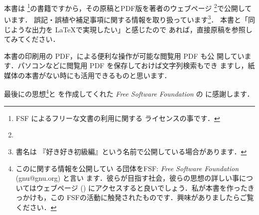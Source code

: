 本書は \fdl\footnote{FSF によるフリーな文書の利用に関する
ライセンスの事です．}の書籍ですから，その原稿とPDF版を著者のウェブページ%
\footnote{\webThorTypo}で公開しています．
誤記・誤植や補足事項に関する情報を取り扱っています\footnote{書名は
『好き好き\LaTeXe 初級編』という名前で公開している場合があります．}．
%
本書と「同じような出力を \LaTeX で実現したい」と感じたので
あれば，直接原稿を参照してみてください．

本書の印刷用の PDF，による便利な操作が可能な閲覧用 PDF も公
開しています．パソコンなどに閲覧用 PDF を保存しておけば文字列検索もでき
ますし，紙媒体の本書がない時にも活用できるものと思います．

最後に\gnu の思想\footnote{このに関する情報を公開してい
る団体をFSF: \emph{Free Software Foundation} (gnu@gnu.org) と言い
ます．彼らが目指す社会，彼らの思想の詳しい事についてはウェブページ
(\webGNU) にアクセスすると良いでしょう．私が本書を作ったきっかけも，この
FSFの活動に触発されたものです．興味がありましたらご覧ください．}と
\fdl を作成してくれた \emph{Free Software Foundation} の
 に感謝します．



